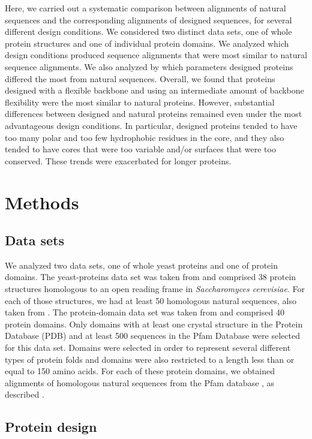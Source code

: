 \documentclass[12pt]{article}
\begin{document}
Here, we carried out a systematic comparison between alignments of natural sequences and the corresponding alignments of designed sequences, for several different design conditions. We considered two distinct data sets, one of whole protein structures and one of individual protein domains. We analyzed which design conditions produced sequence alignments that were most similar to natural sequence alignments. We also analyzed by which parameters designed proteins differed the most from natural sequences. Overall, we found that proteins designed with a flexible backbone and using an intermediate amount of backbone flexibility were the most similar to natural proteins. However, substantial differences between designed and natural proteins remained even under the most advantageous design conditions. In particular, designed proteins tended to have too many polar and too few hydrophobic residues in the core, and they also tended to have cores that were too variable and/or surfaces that were too conserved. These trends were exacerbated for longer proteins.

\section{Methods}
\label{Methods}

\subsection{Data sets}

We analyzed two data sets, one of whole yeast proteins and one of protein domains. The yeast-proteins data set was taken from \citet{Ramsey2011} and comprised 38 protein structures homologous to an open reading frame in \emph{Saccharomyces cerevisiae}. For each of those structures, we had at least 50 homologous natural sequences, also taken from  \citet{Ramsey2011}. The protein-domain data set was taken from \citet{OllikainenKortemme} and comprised 40 protein domains. Only domains with at least one crystal structure in the Protein Database (PDB) and at least 500 sequences in the Pfam Database were selected for this data set. Domains were selected in order to represent several different types of protein folds and domains were also restricted to a length less than or equal to 150 amino acids. For each of these protein domains, we obtained alignments of homologous natural sequences from the Pfam database \citep{Pfam}, as described \citep{OllikainenKortemme}.\subsection{Protein design}
\end{document}
